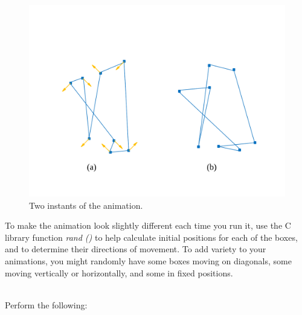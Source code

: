\documentclass[epsfig,10pt,fullpage]{article}
\begin{document}
\begin{figure}[h!]
   \begin{center}
       \includegraphics[scale = 0.5]{figures/fig_animation_example.pdf}
   \end{center}
   \caption{Two instants of the animation.}
	\label{fig:animation_example}
\end{figure}

To make the animation look slightly different each time you run it, use the C library function 
{\it rand ()} to help calculate initial positions for each of the boxes, and to determine 
their directions of movement. To add variety to your animations, you might randomly
have some boxes moving on diagonals, some moving vertically or horizontally, and some in fixed
positions.

~\\
Perform the following:
\end{document}

